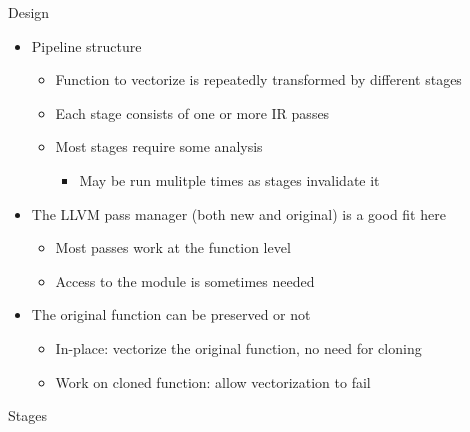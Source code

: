 

\begin{frame}{Design}

\begin{itemize}
    \item Pipeline structure
    \begin{itemize}
        \item Function to vectorize is repeatedly transformed by different stages
        \item Each stage consists of one or more IR passes
        \item Most stages require some analysis
        \begin{itemize}
            \item May be run mulitple times as stages invalidate it
        \end{itemize}
    \end{itemize}
    
    \item The LLVM pass manager (both new and original) is a good fit here
    \begin{itemize}
        \item Most passes work at the function level
        \item Access to the module is sometimes needed
    \end{itemize}
    
    \item The original function can be preserved or not
    \begin{itemize}
        \item In-place: vectorize the original function, no need for cloning
        \item Work on cloned function: allow vectorization to fail
    \end{itemize}
\end{itemize}

\end{frame}


\begin{frame}{Stages}


\end{frame}

